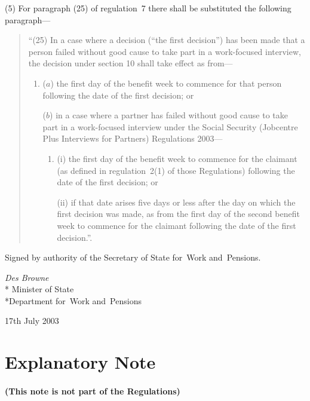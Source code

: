 \documentclass[12pt,a4paper]{article}
\begin{document}
(5) For paragraph (25) of regulation~7 there shall be substituted the following paragraph—
\begin{quotation}
“(25) In a case where a decision (“the first decision”) has been made that a person failed without good cause to take part in a work-focused interview, the decision under section 10 shall take effect as from—
\begin{enumerate}\item[]
($a$) the first day of the benefit week to commence for that person following the date of the first decision; or

($b$) in a case where a partner has failed without good cause to take part in a work-focused interview under the Social Security (Jobcentre Plus Interviews for Partners) Regulations 2003—
\begin{enumerate}\item[]
(i) the first day of the benefit week to commence for the claimant (as defined in regulation~2(1) of those Regulations) following the date of the first decision; or

(ii) if that date arises five days or less after the day on which the first decision was made, as from the first day of the second benefit week to commence for the claimant following the date of the first decision.”. 
\end{enumerate}
\end{enumerate}
\end{quotation}

\bigskip

Signed 
by authority of the 
Secretary of State for~Work and~Pensions.

{\raggedleft
\emph{Des Browne}\\*
Minister
of State\\*Department 
for~Work and~Pensions

}

17th July 2003


\small

\part{Explanatory Note}

\renewcommand\parthead{— Explanatory Note}

\subsection*{(This note is not part of the Regulations)}
\end{document}
